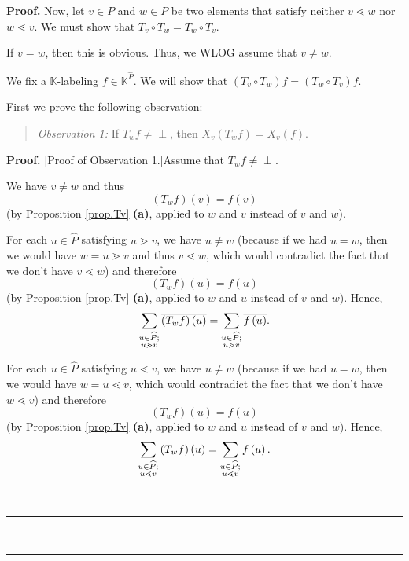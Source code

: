\documentclass[numbers=enddot,12pt,final,onecolumn,notitlepage]{scrartcl}%
\theoremstyle{definition}
\newenvironment{verlong}{}{}
\newenvironment{statement}{\begin{quote}}{\end{quote}}
\newcommand{\undf}{\operatorname*{\bot}}
\newenvironment{proof}[1][Proof]{\noindent\textbf{#1.} }{\ \rule{0.5em}{0.5em}}
\let\sumnonlimits\sum
\renewcommand{\sum}{\sumnonlimits\limits}
\begin{document}
\begin{verlong}
\begin{proof}
Now, let $v\in P$ and $w\in P$ be two elements that satisfy neither $v\lessdot
w$ nor $w\lessdot v$. We must show that $T_{v}\circ T_{w}=T_{w}\circ T_{v}$.

If $v=w$, then this is obvious. Thus, we WLOG assume that $v\neq w$.

We fix a $\mathbb{K}$-labeling $f\in\mathbb{K}^{\widehat{P}}$. We will show
that $\left(  T_{v}\circ T_{w}\right)  f=\left(  T_{w}\circ T_{v}\right)  f$.

First we prove the following observation:

\begin{statement}
\textit{Observation 1:} If $T_{w}f\neq\undf$, then $X_{v}\left(
T_{w}f\right)  =X_{v}\left(  f\right)  $.
\end{statement}

\begin{proof}
[Proof of Observation 1.]Assume that $T_{w}f\neq\undf$.

We have $v\neq w$ and thus
\begin{equation}
\left(  T_{w}f\right)  \left(  v\right)  =f\left(  v\right)
\label{pf.prop.Tv.commute.o1.pf.0}%
\end{equation}
(by Proposition \ref{prop.Tv} \textbf{(a)}, applied to $w$ and $v$ instead of
$v$ and $w$).

For each $u\in\widehat{P}$ satisfying $u\gtrdot v$, we have $u\neq w$ (because
if we had $u=w$, then we would have $w=u\gtrdot v$ and thus $v\lessdot w$,
which would contradict the fact that we don't have $v\lessdot w$) and
therefore
\[
\left(  T_{w}f\right)  \left(  u\right)  =f\left(  u\right)
\]
(by Proposition \ref{prop.Tv} \textbf{(a)}, applied to $w$ and $u$ instead of
$v$ and $w$). Hence,%
\begin{equation}
\sum\limits_{\substack{u\in\widehat{P};\\u\gtrdot v}}\overline{\left(
T_{w}f\right)  \left(  u\right)  }=\sum\limits_{\substack{u\in\widehat{P}%
;\\u\gtrdot v}}\overline{f\left(  u\right)  }.
\label{pf.prop.Tv.commute.o1.pf.2}%
\end{equation}


For each $u\in\widehat{P}$ satisfying $u\lessdot v$, we have $u\neq w$
(because if we had $u=w$, then we would have $w=u\lessdot v$, which would
contradict the fact that we don't have $w\lessdot v$) and therefore
\[
\left(  T_{w}f\right)  \left(  u\right)  =f\left(  u\right)
\]
(by Proposition \ref{prop.Tv} \textbf{(a)}, applied to $w$ and $u$ instead of
$v$ and $w$). Hence,%
\begin{equation}
\sum\limits_{\substack{u\in\widehat{P};\\u\lessdot v}}\left(  T_{w}f\right)
\left(  u\right)  =\sum\limits_{\substack{u\in\widehat{P};\\u\lessdot
v}}f\left(  u\right)  . \label{pf.prop.Tv.commute.o1.pf.1}%
\end{equation}



\end{proof}
\end{proof}
\end{verlong}
\end{document}
